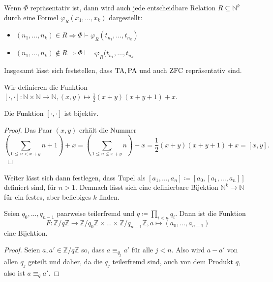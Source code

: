 Wenn $\Phi$ repräsentativ ist, dann wird auch jede entscheidbare Relation $R\subseteq\mathbb{N}^k$ durch eine Formel $\varphi_R(x_1,\dots,x_k)$ dargestellt:
\begin{itemize}
	\item $(n_1,\dots,n_k)\in R \Rightarrow \Phi\vdash\varphi_R(t_{n_1},\dots,t_{n_k})$
	\item $(n_1,\dots,n_k)\notin R \Rightarrow \Phi\vdash\neg\varphi_R(t_{n_1},\dots,t_{n_k}$
\end{itemize}

Insgesamt lässt sich feststellen, dass $\operatorname{TA}, \operatorname{PA}$ und auch $\operatorname{ZFC}$ repräsentativ sind.

\begin{definition}
	Wir definieren die Funktion $[\cdot,\cdot]:\mathbb{N}\times\mathbb{N}\to\mathbb{N}, (x,y)\mapsto\frac{1}{2}(x+y)(x+y+1)+x$.
\end{definition}
\begin{lemma}
	Die Funktion $[\cdot,\cdot]$ ist bijektiv.
\end{lemma}
\begin{proof}
	Das Paar $(x,y)$ erhält die Nummer $$\left(\sum_{0\leq n < x+y}n+1\right)+x=\left(\sum_{1\leq n \leq x+y}n\right)+x=\frac{1}{2}(x+y)(x+y+1)+x=[x,y].$$
\end{proof}

Weiter lässt sich dann festlegen, dass Tupel als $[a_1,\dots,a_n]\coloneqq[a_0,[a_1,\dots,a_n]]$ definiert sind, für $n>1$. Demnach lässt sich eine definierbare Bijektion $\mathbb{N}^k\to \mathbb{N}$ für ein festes, aber beliebiges $k$ finden.

\begin{satz}
	Seien $q_0,\dots,q_{n-1}$ paarweise teilerfremd und $q\coloneqq\prod_{i<n} q_i$. Dann ist die Funktion $$F:\mathbb{Z}/ q\mathbb{Z} \to \mathbb{Z}/q_0\mathbb{Z} \times \dots \times \mathbb{Z}/q_{n-1}\mathbb{Z}, a\mapsto(a_0,\dots,a_{n-1})$$ eine Bijektion.
\end{satz}
\begin{proof}
	Seien $a,a'\in \mathbb{Z}/q\mathbb{Z}$ so, dass $a\equiv_{q_j} a'$ für alle $j<n$. Also wird $a-a'$ von allen $q_j$ geteilt und daher, da die $q_j$ teilerfremd sind, auch von dem Produkt $q$, also ist $a\equiv_q a'$.
\end{proof}

